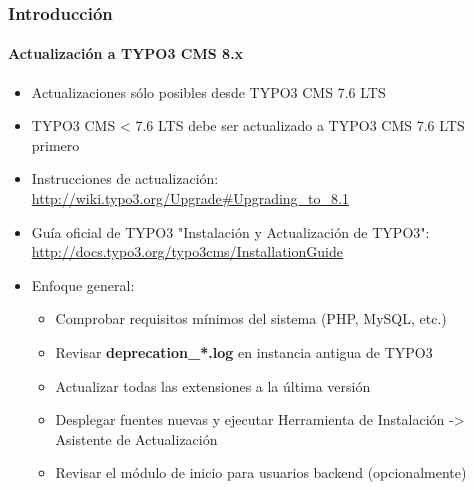 \begin{frame}[fragile]
	\frametitle{Introducción}
	\framesubtitle{Actualización a TYPO3 CMS 8.x}

	\begin{itemize}
		\item Actualizaciones sólo posibles desde TYPO3 CMS 7.6 LTS
		\item TYPO3 CMS < 7.6 LTS debe ser actualizado a TYPO3 CMS 7.6 LTS primero
	\end{itemize}

	\begin{itemize}

		\item Instrucciones de actualización:\newline
			\smaller\url{http://wiki.typo3.org/Upgrade#Upgrading_to_8.1}\normalsize
		\item Guía oficial de TYPO3 "Instalación y Actualización de TYPO3":
			\smaller\url{http://docs.typo3.org/typo3cms/InstallationGuide}\normalsize
		\item Enfoque general:
			\begin{itemize}
				\item Comprobar requisitos mínimos del sistema \small(PHP, MySQL, etc.)
				\item Revisar \textbf{deprecation\_*.log} en instancia antigua de TYPO3
				\item Actualizar todas las extensiones a la última versión
				\item Desplegar fuentes nuevas y ejecutar Herramienta de Instalación -> Asistente de Actualización
				\item Revisar el módulo de inicio para usuarios backend (opcionalmente)
			\end{itemize}
	\end{itemize}

\end{frame}


